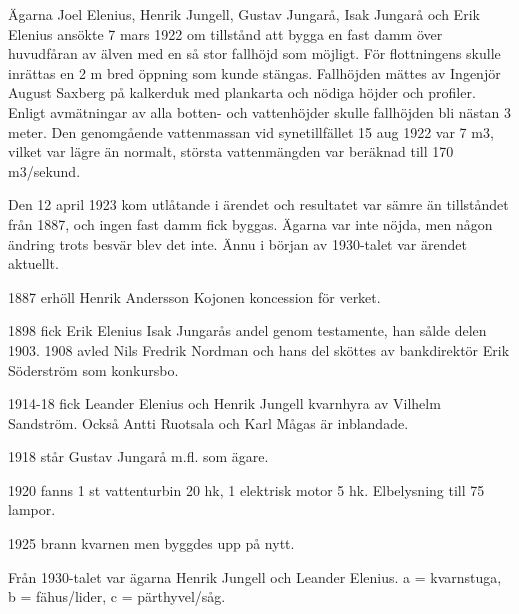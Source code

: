 Ägarna Joel Elenius, Henrik Jungell, Gustav Jungarå, Isak Jungarå och Erik Elenius ansökte 7 mars 1922 om tillstånd att bygga en fast damm över huvudfåran av älven med en så stor fallhöjd som möjligt. För flottningens skulle inrättas en 2 m bred öppning som kunde stängas. Fallhöjden mättes av Ingenjör August Saxberg på kalkerduk med plankarta och nödiga höjder och profiler. Enligt avmätningar av alla botten- och vattenhöjder skulle fallhöjden bli nästan 3 meter. Den genomgående vattenmassan vid synetillfället 15 aug 1922 var 7 m3, vilket var lägre än normalt, största vattenmängden var beräknad till 170 m3/sekund.

Den 12 april 1923 kom utlåtande i ärendet och resultatet var sämre än tillståndet från 1887, och ingen fast damm fick byggas. Ägarna var inte nöjda, men någon ändring trots besvär blev det inte. Ännu i början av 1930-talet var ärendet aktuellt.

1887 erhöll Henrik Andersson Kojonen koncession för verket.

1898 fick Erik Elenius Isak Jungarås andel genom testamente, han sålde delen 1903. 1908 avled Nils Fredrik Nordman och hans del sköttes av bankdirektör Erik Söderström som konkursbo.

1914-18 fick Leander Elenius och Henrik Jungell kvarnhyra av Vilhelm Sandström. Också Antti Ruotsala och Karl Mågas är inblandade.

1918 står Gustav Jungarå m.fl. som ägare.

1920 fanns 1 st vattenturbin 20 hk, 1 elektrisk motor 5 hk. Elbelysning till 75 lampor.

1925 brann kvarnen men byggdes upp på nytt.

Från 1930-talet var ägarna Henrik Jungell och Leander Elenius.
a = kvarnstuga, b = fähus/lider, c = pärthyvel/såg.

